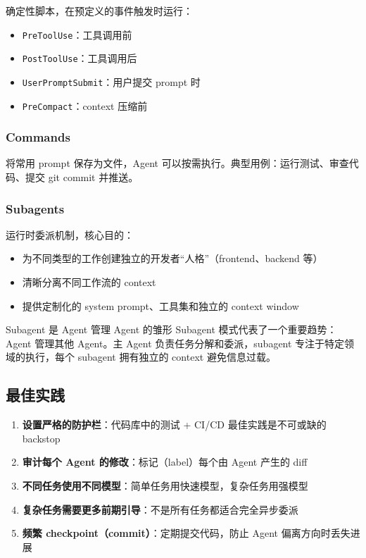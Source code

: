 \documentclass[a4paper]{article}
\begin{document}
确定性脚本，在预定义的事件触发时运行：
\begin{itemize}
    \item \texttt{PreToolUse}：工具调用前
    \item \texttt{PostToolUse}：工具调用后
    \item \texttt{UserPromptSubmit}：用户提交 prompt 时
    \item \texttt{PreCompact}：context 压缩前
\end{itemize}

\subsubsection{Commands}

将常用 prompt 保存为文件，Agent 可以按需执行。典型用例：运行测试、审查代码、提交 git commit 并推送。

\subsubsection{Subagents}

运行时委派机制，核心目的：
\begin{itemize}
    \item 为不同类型的工作创建独立的开发者``人格''（frontend、backend 等）
    \item 清晰分离不同工作流的 context
    \item 提供定制化的 system prompt、工具集和独立的 context window
\end{itemize}

\begin{importantbox}{Subagent 是 Agent 管理 Agent 的雏形}
Subagent 模式代表了一个重要趋势：Agent 管理其他 Agent。主 Agent 负责任务分解和委派，subagent 专注于特定领域的执行，每个 subagent 拥有独立的 context 避免信息过载。
\end{importantbox}

\subsection{最佳实践}

\begin{enumerate}
    \item \textbf{设置严格的防护栏}：代码库中的测试 + CI/CD 最佳实践是不可或缺的 backstop
    \item \textbf{审计每个 Agent 的修改}：标记（label）每个由 Agent 产生的 diff
    \item \textbf{不同任务使用不同模型}：简单任务用快速模型，复杂任务用强模型
    \item \textbf{复杂任务需要更多前期引导}：不是所有任务都适合完全异步委派
    \item \textbf{频繁 checkpoint（commit）}：定期提交代码，防止 Agent 偏离方向时丢失进展
\end{enumerate}
\end{document}
